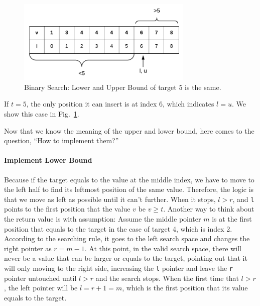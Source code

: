\documentclass[main.tex]{subfiles}
\begin{document}
\begin{figure}[H]
    \centering
    \includegraphics[width=0.9\columnwidth, height=4cm]{fig/binary_search_lower_upper.png}
        \caption{Binary Search: Lower and Upper  Bound of target 5 is the same.}
   
    \label{fig:binary_search_lower_upper}
\end{figure} 


If $t=5$, the only position it can insert is at index 6, which indicates $l = u$. We show this case in Fig.~\ref{fig:binary_search_lower_upper}.

Now that we know the meaning of the upper and lower bound, here comes to the question, ``How to implement them?''

\paragraph{Implement Lower Bound} Because if the target equals to the value at the middle index, we have to move to the left half to find its leftmost position of the same value. Therefore, the logic is that we move as left as possible until it can't  further. When it stops,  $l>r$, and \texttt{l} points to the first position that the value $v$ be $v\geq t$. Another way to think about the return value is with assumption: Assume the middle pointer $m$ is at the first position that equals to the target in the case of target 4, which is index 2. According to the searching rule, it goes to the left search space and changes the right pointer as  $r=m-1$. At this point, in the valid search space, there will never be a value that can be larger or equals to the target, pointing out that it will only moving to the right side, increasing the \texttt{l} pointer and leave the \texttt{r} pointer untouched until  $l > r$ and the search stops. When the first time that $l > r$, the left pointer will be $l = r + 1 = m$, which is the first position that its value equals to the target. 
\end{document}
